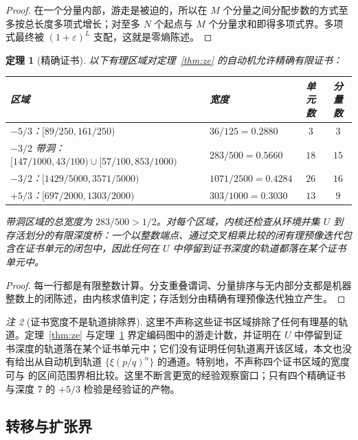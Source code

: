 \documentclass[11pt,a4paper]{article}
\newtheorem{theorem}{定理}[section]
\theoremstyle{remark}
\newtheorem{remark}[theorem]{注}
\begin{document}
\begin{proof}
在一个分量内部，游走是被迫的，所以在 $M$ 个分量之间分配步数的方式至多按总长度多项式增长；对至多 $N$ 个起点与 $M$ 个分量求和即得多项式界。多项式最终被 $(1+\varepsilon)^{L}$ 支配，这就是零熵陈述。
\end{proof}

\begin{theorem}[精确证书]
\label{thm:certs}
以下有理区域对定理~\ref{thm:ze} 的自动机允许精确有限证书：
\begin{center}
\footnotesize
\begin{tabular}{@{}L{0.48\textwidth}L{0.24\textwidth}cc@{}}
\toprule
区域 & 宽度 & 单元数 & 分量数 \\
\midrule
$-5/3$：$[89/250,161/250)$ & $36/125 = 0.2880$ & $3$ & $3$ \\
$-3/2$ 带洞：$[147/1000,43/100)\allowbreak\cup[57/100,853/1000)$ & $283/500 = 0.5660$ & $18$ & $15$ \\
$-3/2$：$[1429/5000,3571/5000)$ & $1071/2500 = 0.4284$ & $26$ & $16$ \\
$+5/3$：$[697/2000,1303/2000)$ & $303/1000 = 0.3030$ & $13$ & $9$ \\
\bottomrule
\end{tabular}
\end{center}
带洞区域的总宽度为 $283/500 > 1/2$。对每个区域，内核还检查从环境并集 $U$ 到存活划分的有限深度桥：一个以整数端点、通过交叉相乘比较的闭有理预像迭代包含在证书单元的闭包中，因此任何在 $U$ 中停留到证书深度的轨道都落在某个证书单元中。
\end{theorem}

\begin{proof}
每一行都是有限整数计算。分支重叠谓词、分量排序与无内部分支都是机器整数上的闭陈述，由内核求值判定；存活划分由精确有理预像迭代独立产生。
\end{proof}

\begin{remark}[证书宽度不是轨道排除界]
\label{rem:certwidths}
这里不声称这些证书区域排除了任何有理基的轨道。定理~\ref{thm:ze} 与定理~\ref{thm:certs} 界定编码图中的游走计数，并证明在 $U$ 中停留到证书深度的轨道落在某个证书单元中；它们没有证明任何轨道离开该区域，本文也没有给出从自动机到轨道 $\{\xi(p/q)^{n}\}$ 的通道。特别地，不声称四个证书区域的宽度可与 \citep{flp1995,luzheng2026} 的区间范围界相比较。这里不断言更宽的经验观察窗口；只有四个精确证书与深度 $7$ 的 $+5/3$ 检验是经验证的产物。
\end{remark}

\subsection{转移与扩张界}
\end{document}
